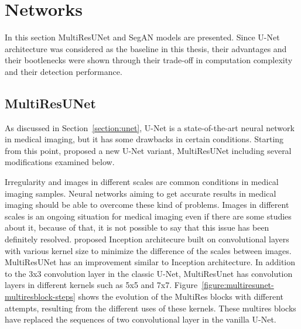 \section{Networks}\label{section:networks}

    In this section MultiResUNet and SegAN models are presented.
    Since U-Net architecture was considered as the baseline in this thesis, their advantages and their bootlenecks were shown through their trade-off in computation complexity and their detection performance.

    \subsection{MultiResUNet}\label{section:multiresunet}

        As discussed in Section~\ref{section:unet}, U-Net is a state-of-the-art neural network in medical imaging, but it has some drawbacks in certain conditions.
        Starting from this point, \citet{ibtehaz2020multiresunet} proposed a new U-Net variant, MultiResUNet including several modifications examined below.

        

        Irregularity and images in different scales are common conditions in medical imaging samples.
        Neural networks aiming to get accurate results in medical imaging should be able to overcome these kind of problems.
        Images in different scales is an ongoing situation for medical imaging even if there are some studies about it, because of that, it is not possible to say that this issue has been definitely resolved.
        \citet{szegedy2015going} proposed Inception architecure built on convolutional layers with various kernel size to minimize the difference of the scales between images.
        MultiResUNet has an improvement similar to Inception architecture.
        In addition to the 3x3 convolution layer in the classic U-Net, MultiResUnet has convolution layers in different kernels such as 5x5 and 7x7.
        Figure~\ref{figure:multiresunet-multiresblock-steps} shows the evolution of the MultiRes blocks with different attempts, resulting from the different uses of these kernels.
        These multires blocks have replaced the sequences of two convolutional layer in the vanilla U-Net.

        


